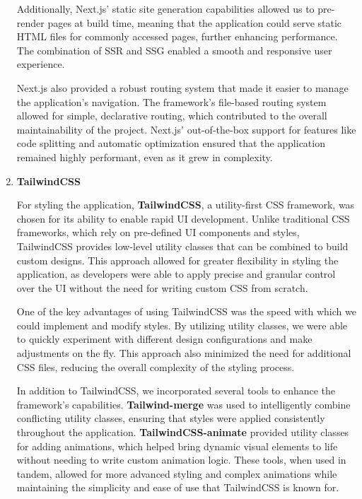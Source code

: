 \begin{enumerate}
    Additionally, Next.js’ static site generation capabilities allowed us to pre{-}render pages at build time, meaning that the application could serve static HTML files for commonly accessed pages, further enhancing performance. The combination of SSR and SSG enabled a smooth and responsive user experience.

    Next.js also provided a robust routing system that made it easier to manage the application’s navigation. The framework’s file{-}based routing system allowed for simple, declarative routing, which contributed to the overall maintainability of the project. Next.js’ out{-}of{-}the{-}box support for features like code splitting and automatic optimization ensured that the application remained highly performant, even as it grew in complexity.


    \item{} \textbf{TailwindCSS}

    For styling the application, \textbf{TailwindCSS}, a utility{-}first CSS framework, was chosen for its ability to enable rapid UI development. Unlike traditional CSS frameworks, which rely on pre{-}defined UI components and styles, TailwindCSS provides low{-}level utility classes that can be combined to build custom designs. This approach allowed for greater flexibility in styling the application, as developers were able to apply precise and granular control over the UI without the need for writing custom CSS from scratch.

    One of the key advantages of using TailwindCSS was the speed with which we could implement and modify styles. By utilizing utility classes, we were able to quickly experiment with different design configurations and make adjustments on the fly. This approach also minimized the need for additional CSS files, reducing the overall complexity of the styling process.

    In addition to TailwindCSS, we incorporated several tools to enhance the framework’s capabilities. \textbf{Tailwind{-}merge} was used to intelligently combine conflicting utility classes, ensuring that styles were applied consistently throughout the application. \textbf{TailwindCSS{-}animate} provided utility classes for adding animations, which helped bring dynamic visual elements to life without needing to write custom animation logic. These tools, when used in tandem, allowed for more advanced styling and complex animations while maintaining the simplicity and ease of use that TailwindCSS is known for.


\end{enumerate}
